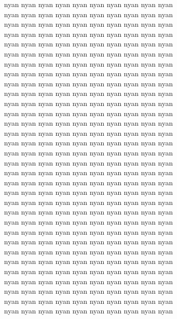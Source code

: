 nyan nyan nyan nyan nyan nyan nyan nyan nyan nyan\\
nyan nyan nyan nyan nyan nyan nyan nyan nyan nyan\\
nyan nyan nyan nyan nyan nyan nyan nyan nyan nyan\\
nyan nyan nyan nyan nyan nyan nyan nyan nyan nyan\\
nyan nyan nyan nyan nyan nyan nyan nyan nyan nyan\\
nyan nyan nyan nyan nyan nyan nyan nyan nyan nyan\\
nyan nyan nyan nyan nyan nyan nyan nyan nyan nyan\\
nyan nyan nyan nyan nyan nyan nyan nyan nyan nyan\\
nyan nyan nyan nyan nyan nyan nyan nyan nyan nyan\\
nyan nyan nyan nyan nyan nyan nyan nyan nyan nyan\\
nyan nyan nyan nyan nyan nyan nyan nyan nyan nyan\\
nyan nyan nyan nyan nyan nyan nyan nyan nyan nyan\\
nyan nyan nyan nyan nyan nyan nyan nyan nyan nyan\\
nyan nyan nyan nyan nyan nyan nyan nyan nyan nyan\\
nyan nyan nyan nyan nyan nyan nyan nyan nyan nyan\\
nyan nyan nyan nyan nyan nyan nyan nyan nyan nyan\\
nyan nyan nyan nyan nyan nyan nyan nyan nyan nyan\\
nyan nyan nyan nyan nyan nyan nyan nyan nyan nyan\\
nyan nyan nyan nyan nyan nyan nyan nyan nyan nyan\\
nyan nyan nyan nyan nyan nyan nyan nyan nyan nyan\\
nyan nyan nyan nyan nyan nyan nyan nyan nyan nyan\\
nyan nyan nyan nyan nyan nyan nyan nyan nyan nyan\\
nyan nyan nyan nyan nyan nyan nyan nyan nyan nyan\\
nyan nyan nyan nyan nyan nyan nyan nyan nyan nyan\\
nyan nyan nyan nyan nyan nyan nyan nyan nyan nyan\\
nyan nyan nyan nyan nyan nyan nyan nyan nyan nyan\\
nyan nyan nyan nyan nyan nyan nyan nyan nyan nyan\\
nyan nyan nyan nyan nyan nyan nyan nyan nyan nyan\\
nyan nyan nyan nyan nyan nyan nyan nyan nyan nyan\\
nyan nyan nyan nyan nyan nyan nyan nyan nyan nyan\\
nyan nyan nyan nyan nyan nyan nyan nyan nyan nyan\\
nyan nyan nyan nyan nyan nyan nyan nyan nyan nyan
